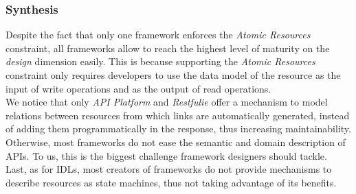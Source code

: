 \subsubsection*{Synthesis}
Despite the fact that only one framework enforces the \textit{Atomic Resources} constraint, all frameworks allow to reach the highest level of maturity on the \textit{design} dimension easily. This is because supporting the \textit{Atomic Resources} constraint only requires developers to use the data model of the resource as the input of write operations and as the output of read operations.\\
We notice that only \textit{API Platform} and \textit{Restfulie} offer a mechanism to model relations between resources from which links are automatically generated, instead of adding them programmatically in the response, thus increasing maintainability.\\
Otherwise, most frameworks do not ease the semantic and domain description of APIs. To us, this is the biggest challenge framework designers should tackle.\\
Last, as for IDLs, most creators of frameworks do not provide mechanisms to describe resources as state machines, thus not taking advantage of its benefits.
